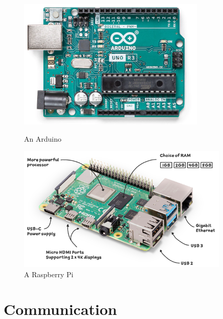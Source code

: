     \begin{figure}[H]
    \centering
    \begin{minipage}{0.4\textwidth}
        \centering
        \includegraphics[width = 0.8\textwidth]{2_images/arduino.png}
        \caption{An Arduino~\cite{arduinoWeb}}
        \label{fig:arduino}
    \end{minipage}\hfill
    \begin{minipage}{0.4\textwidth}
        \centering
        \includegraphics[width = 0.9\textwidth]{2_images/RaspPi.png}
        \caption{A Raspberry Pi~\cite{raspPiWeb}}
        \label{fig:raspPi}
    \end{minipage}\hfill            
    \end{figure}     

\section{Communication}

